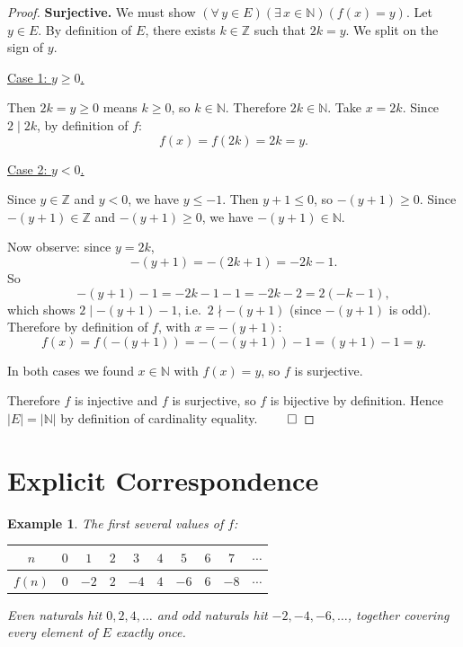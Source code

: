 \documentclass[11pt]{article}
\theoremstyle{defstyle}
\theoremstyle{thmstyle}
\theoremstyle{notstyle}
\newtheorem*{example}{Example}
\theoremstyle{cautionstyle}
\newcommand{\Z}{\mathbb{Z}}
\newcommand{\N}{\mathbb{N}}
\begin{document}
\begin{thmbox}
\begin{proof}
\medskip
\noindent\textbf{Surjective.}
We must show $(\forall\, y \in E)(\exists\, x \in \N)(f(x) = y)$.
Let $y \in E$.  By definition of $E$, there exists $k \in \Z$ such that $2k = y$.
We split on the sign of $y$.

\medskip
\noindent\underline{Case 1: $y \geq 0$.}

Then $2k = y \geq 0$ means $k \geq 0$, so $k \in \N$.  Therefore $2k \in \N$.
Take $x = 2k$.  Since $2 \mid 2k$, by definition of $f$:
\[
  f(x) = f(2k) = 2k = y.
\]

\medskip
\noindent\underline{Case 2: $y < 0$.}

Since $y \in \Z$ and $y < 0$, we have $y \leq -1$.
Then $y + 1 \leq 0$, so $-(y+1) \geq 0$.
Since $-(y+1) \in \Z$ and $-(y+1) \geq 0$, we have $-(y+1) \in \N$.

Now observe: since $y = 2k$,
\[
  -(y+1) = -(2k+1) = -2k - 1.
\]
So
\[
  -(y+1) - 1 = -2k - 1 - 1 = -2k - 2 = 2(-k-1),
\]
which shows $2 \mid -(y+1) - 1$, i.e.\ $2 \nmid -(y+1)$ (since $-(y+1)$ is odd).
Therefore by definition of $f$, with $x = -(y+1)$:
\[
  f(x) = f(-(y+1)) = -(-(y+1)) - 1 = (y+1) - 1 = y.
\]

\medskip
In both cases we found $x \in \N$ with $f(x) = y$, so $f$ is surjective.

\medskip
Therefore $f$ is injective and $f$ is surjective, so $f$ is bijective by definition.
Hence $|E| = |\N|$ by definition of cardinality equality. $\qed$
\end{proof}
\end{thmbox}

\section{Explicit Correspondence}

\begin{notebox}
\begin{example}
The first several values of $f$:

\medskip
\begin{center}
\renewcommand{\arraystretch}{1.5}
\begin{tabular}{|c|c|c|c|c|c|c|c|c|c|}
\hline
$n$    & $0$ & $1$  & $2$ & $3$  & $4$ & $5$  & $6$ & $7$  & $\cdots$ \\
\hline
$f(n)$ & $0$ & $-2$ & $2$ & $-4$ & $4$ & $-6$ & $6$ & $-8$ & $\cdots$ \\
\hline
\end{tabular}
\end{center}

\medskip
Even naturals hit $0, 2, 4, \ldots$ and odd naturals hit $-2, -4, -6, \ldots$,
together covering every element of $E$ exactly once.
\end{example}
\end{notebox}
\end{document}
